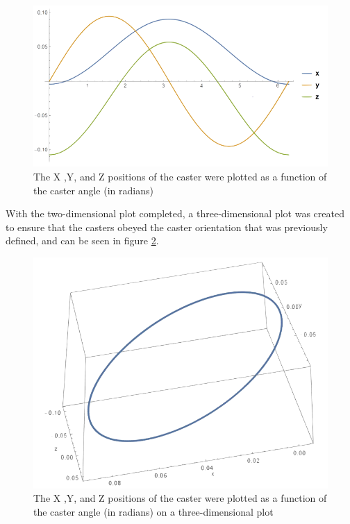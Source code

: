 \documentclass[12pt,letterpaper]{article}
\begin{document}
\begin{figure}[!htb]
	\centering
	\includegraphics[width=\linewidth]{CasterWheel2DTest}
	\caption{The X ,Y, and Z positions of the caster were plotted as a function of the caster angle (in radians)}\label{fig:CasterWheel2DTest}
	\endminipage
\end{figure} 

With the two-dimensional plot completed, a three-dimensional plot was created to ensure that the casters obeyed the caster orientation that was previously defined, and can be seen in figure \ref{fig:CasterWheel3DTest}.

\begin{figure}[!htb]
	\centering
	\includegraphics[width=\linewidth]{CasterWheel3DTest}
	\caption{The X ,Y, and Z positions of the caster were plotted as a function of the caster angle (in radians) on a three-dimensional plot}\label{fig:CasterWheel3DTest}
	\endminipage
\end{figure} 
\end{document}
